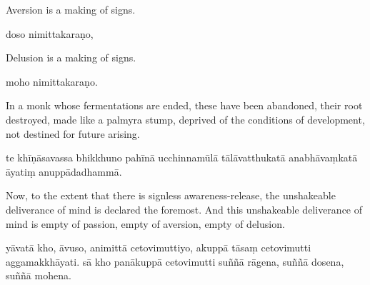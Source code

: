 \begin{samepage}
\begin{leftcolumn*}
Aversion is a making of signs.
\end{leftcolumn*}

\begin{rightcolumn}
doso nimittakaraṇo,
\end{rightcolumn}
\end{samepage}

\begin{samepage}
\begin{leftcolumn*}
Delusion is a making of signs.
\end{leftcolumn*}

\begin{rightcolumn}
moho nimittakaraṇo.
\end{rightcolumn}
\end{samepage}

\begin{samepage}
\begin{leftcolumn*}
In a monk whose fermentations are ended, these have been abandoned, their root destroyed, made like a palmyra stump, deprived of the conditions of development, not destined for future arising.
\end{leftcolumn*}

\begin{rightcolumn}
te khīṇāsavassa bhikkhuno pahīnā ucchinnamūlā tālāvatthukatā anabhāvaṃkatā āyatiṃ anuppādadhammā.
\end{rightcolumn}
\end{samepage}

\begin{samepage}
\begin{leftcolumn*}
Now, to the extent that there is signless awareness-release, the unshakeable deliverance of mind is declared the foremost.
And this unshakeable deliverance of mind is empty of passion, empty of aversion, empty of delusion.
\end{leftcolumn*}

\begin{rightcolumn}
yāvatā kho, āvuso, animittā cetovimuttiyo, akuppā tāsaṃ cetovimutti aggamakkhāyati.
sā kho panākuppā cetovimutti suññā rāgena, suññā dosena, suññā mohena.
\end{rightcolumn}
\end{samepage}

